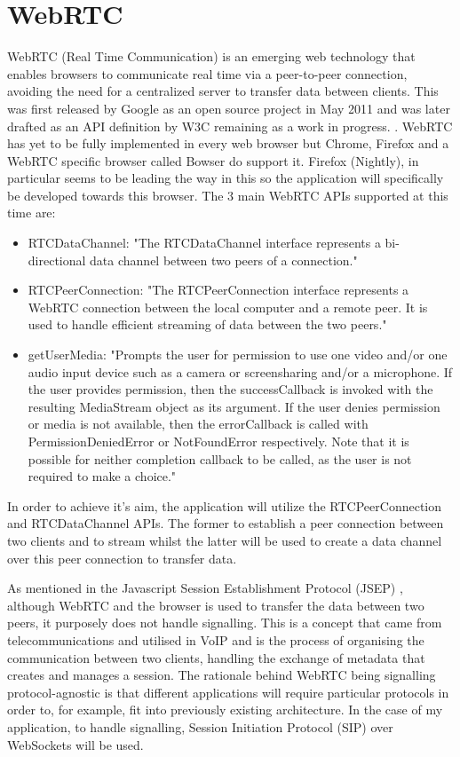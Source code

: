 \documentclass[]{report}
\begin{document}
\section{WebRTC}			
	WebRTC (Real Time Communication) is an emerging web technology that enables browsers to communicate real time via a peer-to-peer connection, avoiding the need for a centralized server to transfer data between clients. This was first released by Google as an open source project in May 2011 \cite{Google WebRTC Release} and was later drafted as an API definition by W3C remaining as a work in progress. \cite{W3C WebRTC Definition}. WebRTC has yet to be fully implemented in every web browser but Chrome, Firefox and a WebRTC specific browser called Bowser do support it. Firefox (Nightly), in particular seems to be leading the way in this so the application will specifically be developed towards this browser\cite{WebRTC browser support}.
	The 3 main WebRTC APIs supported at this time are:
		\begin{itemize}
			\item RTCDataChannel:
			"The RTCDataChannel interface represents a bi-directional data channel between two peers of a connection." \cite{Mozilla Web API}
			\item RTCPeerConnection:
			"The RTCPeerConnection interface represents a WebRTC connection between the local computer and a remote peer. It is used to handle efficient streaming of data between the two peers." 
			\cite{Mozilla Web API}
			\item getUserMedia:
			"Prompts the user for permission to use one video and/or one audio input device such as a camera or screensharing and/or a microphone. If the user provides permission, then the successCallback is invoked with the resulting MediaStream object as its argument. If the user denies permission or media is not available, then the errorCallback is called with PermissionDeniedError or NotFoundError respectively. Note that it is possible for neither completion callback to be called, as the user is not required to make a choice."\cite{Mozilla Web API}
		\end{itemize}
	In order to achieve it's aim, the application will utilize the RTCPeerConnection and RTCDataChannel APIs. The former to establish a peer connection between two clients and to stream whilst the latter will be used to create a data channel over this peer connection to transfer data.
			
	As mentioned in the Javascript Session Establishment Protocol (JSEP) \cite{JSEP}, although WebRTC and the browser is used to transfer the data between two peers, it purposely does not handle signalling. This is a concept that came from telecommunications and utilised in VoIP and is the process of organising the communication between two clients, handling the exchange of metadata that creates and manages a session. The rationale behind WebRTC being signalling protocol-agnostic is that different applications will require particular protocols in order to, for example, fit into previously existing architecture. In the case of my application, to handle signalling, Session Initiation Protocol (SIP) over WebSockets will be used.
	
\end{document}
